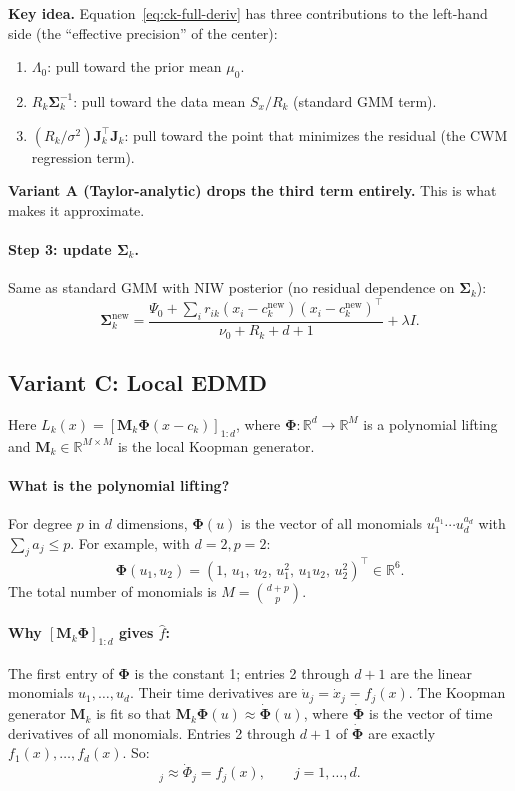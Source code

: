 \documentclass[11pt]{article}
\theoremstyle{definition}
\theoremstyle{plain}
\theoremstyle{remark}
\newcommand{\R}{\mathbb{R}}
\newcommand{\Sv}{\boldsymbol{\Sigma}}
\newcommand{\Jv}{\boldsymbol{J}}
\newcommand{\Mv}{\boldsymbol{M}}
\newcommand{\Phiv}{\boldsymbol{\Phi}}
\newenvironment{keyidea}{\par\medskip\noindent\textbf{Key idea.} }{\par\medskip}
\begin{document}
\begin{keyidea}
Equation~\eqref{eq:ck-full-deriv} has three contributions to the left-hand side (the ``effective precision'' of the center):
\begin{enumerate}[leftmargin=*,itemsep=0pt]
  \item $\Lambda_0$: pull toward the prior mean $\mu_0$.
  \item $R_k\Sv_k^{-1}$: pull toward the data mean $S_x/R_k$ (standard GMM term).
  \item $(R_k/\sigma^2)\Jv_k^\top\Jv_k$: pull toward the point that minimizes the residual (the CWM regression term).
\end{enumerate}
\textbf{Variant A (Taylor-analytic) drops the third term entirely.} This is what makes it approximate.
\end{keyidea}

\paragraph{Step 3: update $\Sv_k$.} Same as standard GMM with NIW posterior (no residual dependence on $\Sv_k$):
\begin{equation}
  \Sv_k^{\mathrm{new}} = \frac{\Psi_0 + \sum_i r_{ik}(x_i-c_k^{\mathrm{new}})(x_i-c_k^{\mathrm{new}})^\top}{\nu_0+R_k+d+1} + \lambda I.
\end{equation}

\subsection{Variant C: Local EDMD}

Here $L_k(x)=[\Mv_k\Phiv(x-c_k)]_{1{:}d}$, where $\Phiv\colon\R^d\to\R^M$ is a polynomial lifting and $\Mv_k\in\R^{M\times M}$ is the local Koopman generator.

\paragraph{What is the polynomial lifting?}
For degree $p$ in $d$ dimensions, $\Phiv(u)$ is the vector of all monomials $u_1^{a_1}\cdots u_d^{a_d}$ with $\sum_j a_j\leq p$. For example, with $d=2,p=2$:
\begin{equation}
  \Phiv(u_1,u_2) = (1,\, u_1,\, u_2,\, u_1^2,\, u_1 u_2,\, u_2^2)^\top \in\R^6.
\end{equation}
The total number of monomials is $M=\binom{d+p}{p}$.

\paragraph{Why $[\Mv_k\Phiv]_{1{:}d}$ gives $\hat{f}$:}
The first entry of $\Phiv$ is the constant 1; entries 2 through $d+1$ are the linear monomials $u_1,\dots,u_d$. Their time derivatives are $\dot{u}_j=\dot{x}_j=f_j(x)$. The Koopman generator $\Mv_k$ is fit so that $\Mv_k\Phiv(u)\approx\dot{\Phiv}(u)$, where $\dot{\Phiv}$ is the vector of time derivatives of all monomials. Entries 2 through $d+1$ of $\dot{\Phiv}$ are exactly $f_1(x),\dots,f_d(x)$. So:
\begin{equation}
  [\Mv_k\Phiv(x-c_k)]_j \approx \dot{\Phi}_j = f_j(x), \qquad j=1,\dots,d.
\end{equation}
\end{document}
